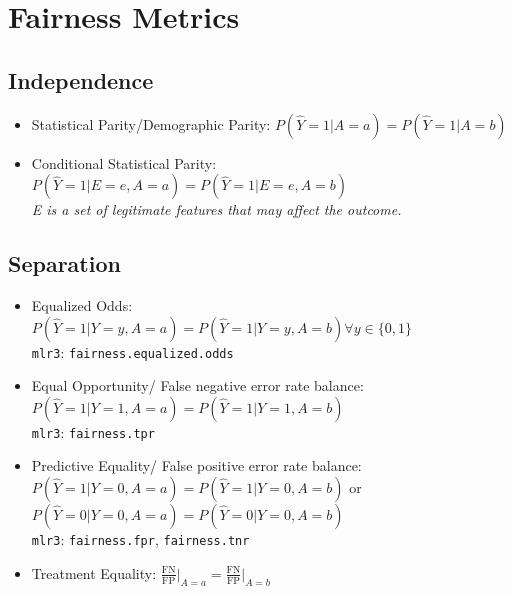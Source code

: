 \documentclass[11pt,a4paper]{article}
\begin{document}
\section{Fairness Metrics \parencite{verma2018}}

\subsection*{Independence}
\begin{itemize}[leftmargin=2em]
    \item Statistical Parity/Demographic Parity: $P(\hat{Y} = 1 | A = a) = P(\hat{Y} = 1 | A = b)$
    \item Conditional Statistical Parity: $P(\hat{Y} = 1 | E = e, A = a) = P(\hat{Y} = 1 | E = e, A = b)$ \\ \textit{E is a set of legitimate features that may affect the outcome.}
\end{itemize}

\subsection*{Separation}
\begin{itemize}[leftmargin=2em]
    \item Equalized Odds: $P(\hat{Y} = 1 | Y = y, A = a) = P(\hat{Y} = 1 | Y = y, A = b) \forall y \in \{0, 1\}$ \\ \texttt{mlr3}: \texttt{fairness.equalized.odds}
    \item Equal Opportunity/ False negative error rate balance: $P(\hat{Y} = 1 | Y = 1, A = a) = P(\hat{Y} = 1 | Y = 1, A = b)$ \\ \texttt{mlr3}: \texttt{fairness.tpr}
    \item Predictive Equality/ False positive error rate balance: $P(\hat{Y} = 1 | Y = 0, A = a) = P(\hat{Y} = 1 | Y = 0, A = b)$ or \\ $P(\hat{Y} = 0 | Y = 0, A = a) = P(\hat{Y} = 0 | Y = 0, A = b)$ \\ \texttt{mlr3}: \texttt{fairness.fpr}, \texttt{fairness.tnr}
    \item Treatment Equality: $\frac{\text{FN}}{\text{FP}} \big|_{A = a} = \frac{\text{FN}}{\text{FP}} \big|_{A = b}$
\end{itemize}
\end{document}
